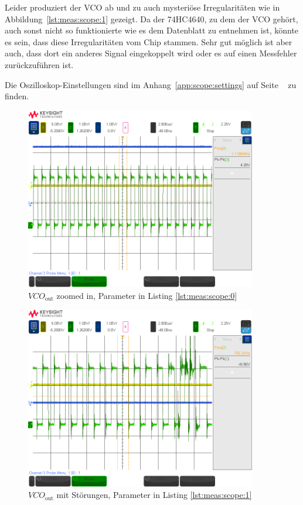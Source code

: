 Leider produziert der VCO ab und zu auch mysteri\"ose Irregularit\"aten wie in
Abbildung~\ref{lst:meas:scope:1}  gezeigt. Da der  74HC4640,  zu  dem der  VCO
geh\"ort, auch sonst nicht so funktionierte wie es dem Datenblatt zu entnehmen
ist, k\"onnte es sein, dass diese Irregularit\"aten vom Chip stammen. Sehr gut
m\"oglich ist aber  auch, dass dort ein anderes Signal  eingekoppelt wird oder
es auf einen Messfehler zur\"uckzuf\"uhren ist.

Die  Oszilloskop-Einstellungen  sind  im  Anhang~\ref{app:scope:settings}  auf
Seite ~\pageref{app:scope:settings} zu finden.

\vspace*{7em}
\begin{figure}[h!tb]
    \centering
    \includegraphics[width=0.9\textwidth, trim=0mm 21mm 0mm 11mm, clip]{images/scopeShots/scope_0b.png}
    \caption{$VCO_{\mathrm{out}}$ zoomed in, Parameter in Listing \ref{lst:meas:scope:0}}
    \label{fig:meas:scope:0}
\end{figure}

\begin{figure}[h!tb]
    \centering
    \includegraphics[width=0.9\textwidth, trim=0mm 21mm 0mm 11mm, clip]{images/scopeShots/scope_1b.png}
    \caption{$VCO_{\mathrm{out}}$ mit St\"orungen, Parameter in Listing \ref{lst:meas:scope:1}}
    \label{fig:meas:scope:1}
\end{figure}

